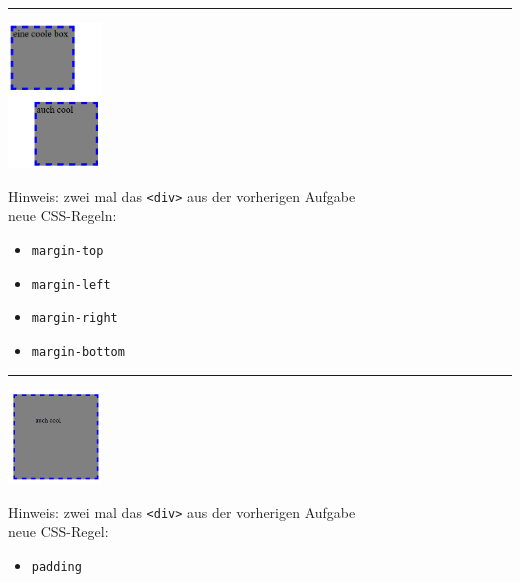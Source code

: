 \documentclass[11pt]{article}
\begin{document}
    \vspace{0.5cm}
    \hrule
    \vspace{0.5cm}

    \begin{minipage}{0.4\textwidth}
        \includegraphics[width=2.5cm]{css3} \\
    \end{minipage}
    \hspace{0.1\textwidth}
    \begin{minipage}{0.4\textwidth}
        Hinweis: zwei mal das \Verb"<div>" aus der vorherigen Aufgabe \\

        neue CSS-Regeln:
        \begin{itemize}
            \item \Verb"margin-top"
            \item \Verb"margin-left"
            \item \Verb"margin-right"
            \item \Verb"margin-bottom"
        \end{itemize}


    \end{minipage}

    \vspace{0.5cm}
    \hrule
    \vspace{0.5cm}

    \begin{minipage}{0.4\textwidth}
        \includegraphics[width=2.5cm]{css4} \\
    \end{minipage}
    \hspace{0.1\textwidth}
    \begin{minipage}{0.4\textwidth}
        Hinweis: zwei mal das \Verb"<div>" aus der vorherigen Aufgabe \\

        neue CSS-Regel:
        \begin{itemize}
            \item \Verb"padding"
        \end{itemize}


    \end{minipage}
\end{document}
